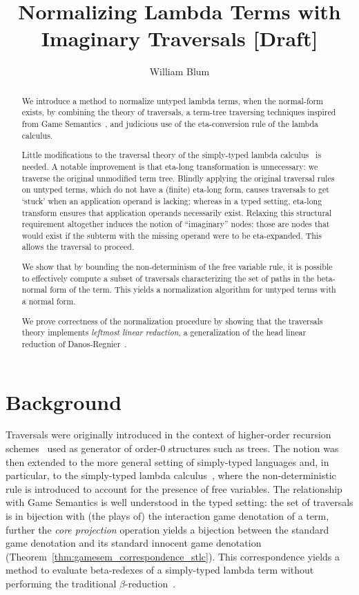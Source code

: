 \documentclass{article}
\author{William Blum}
\title{Normalizing Lambda Terms with Imaginary Traversals [Draft]}
\theoremstyle{plain}
\theoremstyle{definition}
\theoremstyle{remark}
\begin{document}
\maketitle
\begin{abstract}
We introduce a method to normalize untyped lambda terms, when the normal-form exists, by combining the theory of traversals, a term-tree traversing techniques inspired from Game Semantics~\cite{Ong2006,BlumPhd}, and judicious use of the eta-conversion rule of the lambda calculus.

Little modifications to the traversal theory of the simply-typed lambda calculus~\cite{BlumPhd} is needed. A notable improvement is that eta-long transformation is unnecessary: we traverse the original unmodified term tree. Blindly applying the original traversal rules on untyped terms, which do not have a (finite) eta-long form, causes traversals to get `stuck' when an application operand is lacking; whereas in a typed setting, eta-long transform ensures that application operands necessarily exist. Relaxing this structural requirement altogether induces the notion of ``imaginary'' nodes: those are nodes that would exist
 if the subterm with the missing operand were to be eta-expanded. This allows the traversal to proceed.

We show that by bounding the non-determinism of the free variable rule, it is possible to effectively compute a subset of traversals characterizing the set of paths in the beta-normal form of the term. This yields a normalization algorithm for untyped terms with a normal form.

We prove correctness of the normalization procedure by showing that the traversals theory implements \emph{leftmost linear reduction}, a generalization of the head linear reduction of Danos-Regnier~\cite{danos-head}.
\end{abstract}

\section{Background}

Traversals were originally introduced in the context of higher-order recursion schemes~\cite{Ong2006} used as generator of order-$0$ structures such as trees.
The notion was then extended to the more general setting of simply-typed languages and, in particular, to the simply-typed lambda calculus~\cite{BlumPhd}, where the non-deterministic rule  is introduced to account for the presence of free variables. The relationship with Game Semantics is well understood in the typed setting: the set of traversals is in bijection with (the plays of) the interaction game denotation of a term, further the \emph{core projection} operation yields a bijection between the standard game denotation and its standard innocent game denotation (Theorem~\ref{thm:gamesem_correspondence_stlc}). This correspondence yields a method to evaluate beta-redexes of a simply-typed lambda term without performing the traditional $\beta$-reduction~\cite{danos-head,BlumPhd,BlumGalop2008, Blum-LocalBeta2008}.
\end{document}
